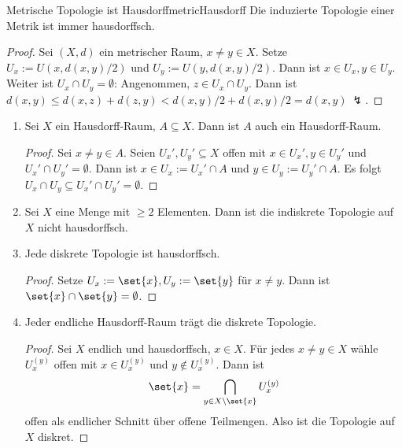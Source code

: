 \documentclass[language=ngerman]{TemplateLecture} %
\begin{document}
\begin{thm}{Metrische Topologie ist Hausdorff}{metricHausdorff}
    Die induzierte Topologie einer Metrik ist immer hausdorffsch.
\end{thm}
\begin{proof}
    Sei $(X,d)$ ein metrischer Raum, $x \neq y \in X$. Setze $U_x := U(x, d(x,y)/2)$ und $U_y := U(y, d(x,y)/2)$. Dann ist $x \in U_x, y \in U_y$. Weiter ist $U_x \cap U_y = \emptyset$: Angenommen, $z \in U_x \cap U_y$. Dann ist $d(x,y) \leq d(x,z) + d(z,y) < d(x,y)/2 + d(x,y)/2 = d(x,y) ~\lightning$.
\end{proof}

\begin{remark}
    \begin{enumerate}[$(i)$]
        \item Sei $X$ ein Hausdorff-Raum, $A \subseteq X$. Dann ist $A$ auch ein Hausdorff-Raum.
        \begin{proof}
            Sei $x \neq y \in A$. Seien $U_x', U_y' \subseteq X$ offen mit $x \in U_x', y \in U_y'$ und $U_x' \cap U_y' = \emptyset$. Dann ist $x \in U_x := U_x' \cap A$ und $y \in U_y := U_y' \cap A$. Es folgt $U_x \cap U_y \subseteq U_x' \cap U_y' = \emptyset$.
        \end{proof}
        \item Sei $X$ eine Menge mit $\geq 2$ Elementen. Dann ist die indiskrete Topologie auf $X$ nicht hausdorffsch.
        \item Jede diskrete Topologie ist hausdorffsch.
        \begin{proof}
            Setze $U_x := \set{x}, U_y := \set{y}$ für $x \neq y$. Dann ist $\set{x} \cap \set{y} = \emptyset$.
        \end{proof}
        \item Jeder endliche Hausdorff-Raum trägt die diskrete Topologie.
        \begin{proof}
            Sei $X$ endlich und hausdorffsch, $x \in X$. Für jedes $x \neq y \in X$ wähle $U_x^{(y)}$ offen mit $x \in U_x^{(y)}$ und $y \notin U_x^{(y)}$. Dann ist 
            \begin{equation*}
                \set{x} = \bigcap_{y \in X \setminus \set{x}} U_x^{(y)}
            \end{equation*}
            offen als endlicher Schnitt über offene Teilmengen. Also ist die Topologie auf $X$ diskret.
        \end{proof}
    \end{enumerate}
\end{remark}
\end{document}
